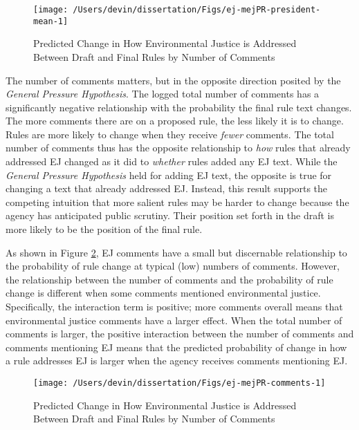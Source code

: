 \documentclass[
      12pt,
        ]{article}
\begin{document}
\begin{figure}

{\centering \texttt{[image: /Users/devin/dissertation/Figs/ej-mejPR-president-mean-1]} 

}

\caption{Predicted Change in How Environmental Justice is Addressed Between Draft and Final Rules by Number of Comments}\label{fig:ej-mejPR-president-mean-1}
\end{figure}

The number of comments matters, but in the opposite direction posited by the \emph{General Pressure Hypothesis}. The logged total number of comments has a significantly negative relationship with the probability the final rule text changes. The more comments there are on a proposed rule, the less likely it is to change. Rules are more likely to change when they receive \emph{fewer} comments. The total number of comments thus has the opposite relationship to \emph{how} rules that already addressed EJ changed as it did to \emph{whether} rules added any EJ text. While the \emph{General Pressure Hypothesis} held for adding EJ text, the opposite is true for changing a text that already addressed EJ. Instead, this result supports the competing intuition that more salient rules may be harder to change because the agency has anticipated public scrutiny. Their position set forth in the draft is more likely to be the position of the final rule.

As shown in Figure \ref{fig:ej-mejPR-comments}, EJ comments have a small but discernable relationship to the probability of rule change at typical (low) numbers of comments. However, the relationship between the number of comments and the probability of rule change is different when some comments mentioned environmental justice. Specifically, the interaction term is positive; more comments overall means that environmental justice comments have a larger effect. When the total number of comments is larger, the positive interaction between the number of comments and comments mentioning EJ means that the predicted probability of change in how a rule addresses EJ is larger when the agency receives comments mentioning EJ.

\begin{figure}

{\centering \texttt{[image: /Users/devin/dissertation/Figs/ej-mejPR-comments-1]} 

}

\caption{Predicted Change in How Environmental Justice is Addressed Between Draft and Final Rules by Number of Comments}\label{fig:ej-mejPR-comments}
\end{figure}
\end{document}
